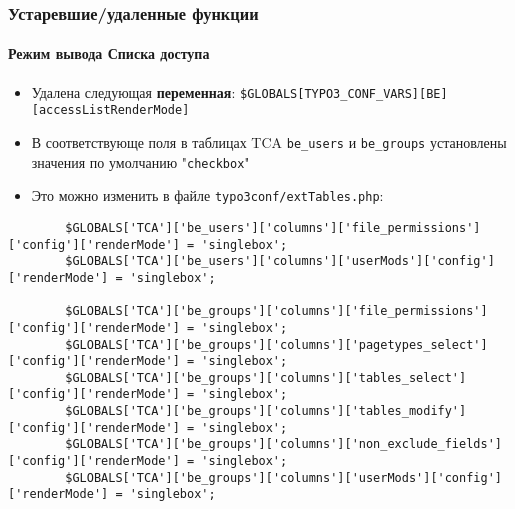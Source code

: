 
\begin{frame}[fragile]
	\frametitle{Устаревшие/удаленные функции}
	\framesubtitle{Режим вывода Списка доступа}

	\lstset{basicstyle=\tiny\ttfamily}

	\begin{itemize}

		\item Удалена следующая \textbf{переменная}:
			\small\texttt{\$GLOBALS[TYPO3\_CONF\_VARS][BE][accessListRenderMode]}\normalsize

		\item В соответствующе поля в таблицах TCA \texttt{be\_users} и \texttt{be\_groups}
			установлены значения по умолчанию "\texttt{checkbox}"

		\item Это можно изменить в файле \texttt{typo3conf/extTables.php}:

	\end{itemize}

	\begin{lstlisting}
		$GLOBALS['TCA']['be_users']['columns']['file_permissions']['config']['renderMode'] = 'singlebox';
		$GLOBALS['TCA']['be_users']['columns']['userMods']['config']['renderMode'] = 'singlebox';

		$GLOBALS['TCA']['be_groups']['columns']['file_permissions']['config']['renderMode'] = 'singlebox';
		$GLOBALS['TCA']['be_groups']['columns']['pagetypes_select']['config']['renderMode'] = 'singlebox';
		$GLOBALS['TCA']['be_groups']['columns']['tables_select']['config']['renderMode'] = 'singlebox';
		$GLOBALS['TCA']['be_groups']['columns']['tables_modify']['config']['renderMode'] = 'singlebox';
		$GLOBALS['TCA']['be_groups']['columns']['non_exclude_fields']['config']['renderMode'] = 'singlebox';
		$GLOBALS['TCA']['be_groups']['columns']['userMods']['config']['renderMode'] = 'singlebox';
	\end{lstlisting}

\end{frame}

